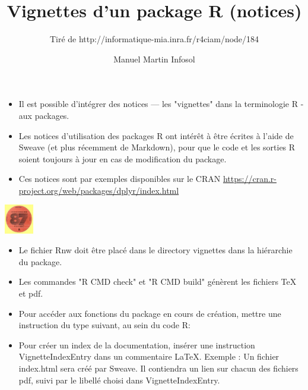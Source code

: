 \documentclass[12pt,handout]{beamer}
\author{Manuel Martin Infosol}
\title{Vignettes d'un package R (notices)}
\subtitle{Tiré de http://informatique-mia.inra.fr/r4ciam/node/184}
\begin{document}
\begin{frame}
\titlepage
\end{frame}


\begin{frame}[fragile]
\begin{itemize}
\item Il est possible d'intégrer des notices — les "vignettes" dans la terminologie R - aux packages.
\item Les notices d’utilisation des packages R ont intérêt
à être écrites à l'aide de Sweave (et plus récemment de Markdown),
pour que le code et les sorties R soient toujours à jour en cas de modification du package.
\item Ces notices sont par exemples disponibles sur le CRAN \url{https://cran.r-project.org/web/packages/dplyr/index.html}
\end{itemize}
\includegraphics[width = 36pt]{../images/vigtnette.jpg}
\end{frame}


\begin{frame}
\begin{itemize}
\item Le fichier Rnw doit être placé dans le directory vignettes dans la hiérarchie du package.
\item Les commandes "R CMD check" et "R CMD build" génèrent les fichiers TeX et pdf.
\item Pour accéder aux fonctions du package en cours de création, mettre une instruction du type suivant, au sein du code R:
 
\item Pour créer un index de la documentation, insérer une instruction \\VignetteIndexEntry dans un commentaire LaTeX. Exemple :
Un fichier index.html sera créé par Sweave.
Il contiendra un lien sur chacun des fichiers pdf, suivi par le libellé choisi dans VignetteIndexEntry.
\end{itemize}

\end{frame}
\end{document}
